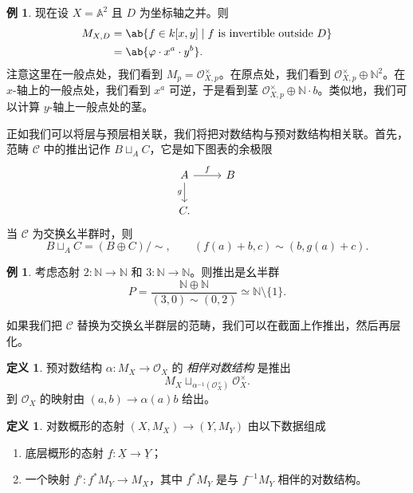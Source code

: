 \documentclass{amsart}
\theoremstyle{definition}
\newtheorem{defn}[thm]{定义}
\newtheorem{exm}[thm]{例}
\theoremstyle{remark}
\theoremstyle{plain}
\theoremstyle{definition}
\theoremstyle{remark}
\newcommand{\A}{\mathbb{A}}
\newcommand{\N}{\mathbb{N}}
\newcommand{\mc}[1]{\mathcal{#1}}
\newcommand{\ul}[1]{\underline{#1}}
\newcommand{\1}{\mathbf{1}}
\newcommand{\2}{\mathbf{2}}
\newcommand{\3}{\mathbf{3}}
\begin{document}
\begin{exm}
    现在设 \(X = \A^2\) 且 \(D\) 为坐标轴之并。则
    \begin{align*}
        M_{X,D} &= \ab\{f \in k[x,y] \mid f \text{ is invertible outside } D \} \\
        &= \ab\{\varphi \cdot x^a \cdot y^b\}.
    \end{align*}
    注意这里在一般点处，我们看到 \(M_p = \mc{O}_{X,p}^{\times}\)。在原点处，我们看到 \(\mc{O}_{X,p}^{\times}\oplus \N^2\)。在 \(x\)-轴上的一般点处，我们看到 \(x^a\) 可逆，于是看到茎 \(\mc{O}_{X,p}^{\times}\oplus \N \cdot b\)。类似地，我们可以计算 \(y\)-轴上一般点处的茎。
\end{exm}

正如我们可以将层与预层相关联，我们将把对数结构与预对数结构相关联。首先，范畴 \(\mc{C}\) 中的推出记作 \(B \sqcup_A C\)，它是如下图表的余极限
\begin{equation*}
\begin{tikzcd}
    A \ar{r}{f} \ar{d}[swap]{g} & B \\
    C.
\end{tikzcd}
\end{equation*}
当 \(\mc{C}\) 为交换幺半群时，则
\[ B \sqcup_A C = (B \oplus C)/\sim, \qquad (f(a) + b, c) \sim (b, g(a)+c). \]

\begin{exm}
    考虑态射 \(2 \colon \N \to \N\) 和 \(3 \colon \N \to \N\)。则推出是幺半群
    \[ P = \frac{\N \oplus \N}{(3, 0) \sim (0,2)} \simeq \N \setminus \{1\}. \]
\end{exm}

如果我们把 \(\mc{C}\) 替换为交换幺半群层的范畴，我们可以在截面上作推出，然后再层化。

\begin{defn}
    预对数结构 \(\alpha \colon M_X \to \mc{O}_X\) 的 \textit{相伴对数结构} 是推出
    \[ M_X \sqcup_{\alpha^{-1}(\mc{O}_X^{\times})} \mc{O}_X^{\times}. \]
    到 \(\mc{O}_X\) 的映射由 \((a,b) \to \alpha(a) b\) 给出。
\end{defn}

\begin{defn}
    对数概形的态射 \((X, M_X) \to (Y, M_Y)\) 由以下数据组成
    \begin{enumerate}
        \item 底层概形的态射 \(\ul{f} \colon \ul{X} \to \ul{Y}\)；
        \item 一个映射 \(f^{\flat} \colon f^* M_Y \to M_X\)，其中 \(f^* M_Y\) 是与 \(f^{-1} M_Y\) 相伴的对数结构。
    \end{enumerate}
\end{defn}
\end{document}
